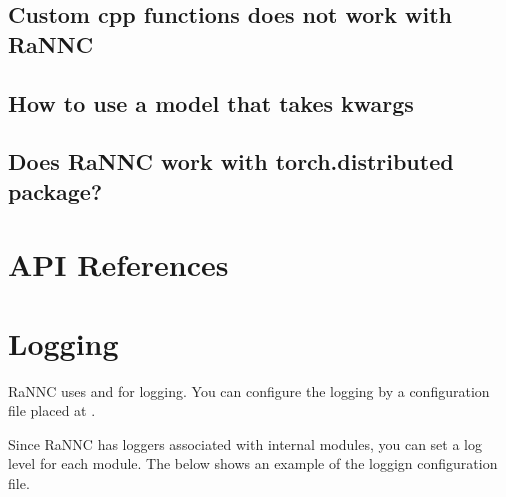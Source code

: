 \documentclass[letterpaper,10pt,english]{sphinxmanual}
\begin{document}
\section{Custom cpp functions does not work with RaNNC}
\label{\detokenize{faq:custom-cpp-functions-does-not-work-with-rannc}}

\section{How to use a model that takes kwargs}
\label{\detokenize{faq:how-to-use-a-model-that-takes-kwargs}}

\section{Does RaNNC work with torch.distributed package?}
\label{\detokenize{faq:does-rannc-work-with-torch-distributed-package}}

\chapter{API References}
\label{\detokenize{references:api-references}}\label{\detokenize{references::doc}}

\chapter{Logging}
\label{\detokenize{logging:logging}}\label{\detokenize{logging::doc}}
RaNNC uses  and
 for logging.
You can configure the logging by a configuration file
placed at .

Since RaNNC has loggers associated with internal modules,
you can set a log level for each module.
The below shows an example of the loggign configuration file.
\end{document}
